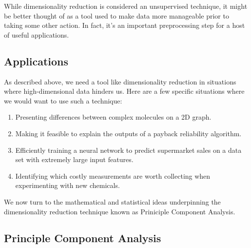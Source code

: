 While dimensionality reduction is considered an unsupervised technique, it might be better thought of as a tool used to make data more manageable prior to taking some other action. In fact, it's an important preprocessing step for a host of useful applications.

\subsection{Applications}
As described above, we need a tool like dimensionality reduction in situations where high-dimensional data hinders us. Here are a few specific situations where we would want to use such a technique:

\begin{enumerate}
    \item Presenting differences between complex molecules on a 2D graph.
    \item Making it feasible to explain the outputs of a payback reliability algorithm.
    \item Efficiently training a neural network to predict supermarket sales on a data set with extremely large input features.
    \item Identifying which costly measurements are worth collecting when experimenting with new chemicals.
\end{enumerate}

We now turn to the mathematical and statistical ideas underpinning the dimensionality reduction technique known as Priniciple Component Analysis.

\subsection{Principle Component Analysis}